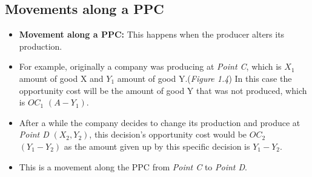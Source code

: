 \documentclass[11pt, a4paper, openany]{book}
\begin{document}
\subsection{Movements along a PPC}

\begin{itemize}\itemsep0em
    \item \textbf{Movement along a PPC:} This happens when the producer alters its production.
    \item For example, originally a company was producing at \textit{Point C}, which is $X_1$ amount of good X
        and $Y_1$ amount of good Y.(\textit{Figure 1.4}) In this case the opportunity cost will be the amount of good Y
        that was not produced, which is $OC_1$ $(A - Y_1)$.
    \item After a while the company decides to change its production and produce at \textit{Point D} $(X_2, Y_2)$, this decision's
        opportunity cost would be $OC_2$ $(Y_1 - Y_2)$ as the amount given up by this specific decision is $Y_1 - Y_2$.
    \item This is a movement along the PPC from \textit{Point C} to \textit{Point D}.
        \begin{figure}[!h]
            \centering
            \begin{minipage}{0.45\textwidth}
\end{minipage}
\end{figure}
\end{itemize}
\end{document}
